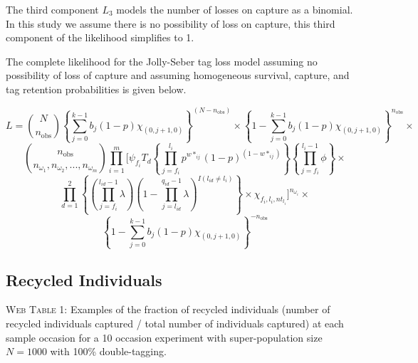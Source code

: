 \documentclass[]{article}
\begin{document}
The third component \(L_3\) models the number of losses on capture as a
binomial. In this study we assume there is no possibility of loss on
capture, this third component of the likelihood simplifies to 1. 


The complete likelihood for the Jolly-Seber tag loss model assuming no
possibility of loss of capture and assuming homogeneous survival,
capture, and tag retention probabilities is given below.

\[
L=\binom{N}{n_\text{obs}} \left\{ \sum_{j=0}^{k-1} b_j(1-p)\chi_{(0,j+1,0)} \right\} ^{(N-n_\text{obs})} \times \left\{ 1- \sum_{j=0}^{k-1} b_j(1-p)\chi_{(0,j+1,0)} \right\} ^{n_\text{obs}} \times
\] \[
\binom{n_\text{obs}}{n_{\omega_1},n_{\omega_2},...,n_{\omega_m}} \prod_{i=1}^{m} \Bigg[ \psi_{f_i} T_d \left\{ \prod_{j=f_i}^{l_i} p^{w*_{ij}} (1-p)^{(1-w*_{ij})} \right\} \left\{ \prod_{j=f_i}^{l_i-1} \phi \right\} \times 
\] \[
\prod_{d=1}^{2} \left\{ \left( \prod_{j=f_i}^{l_{id}-1} \lambda \right) \left(1-\prod_{j=l_{id}}^{q_{id}-1} \lambda \right)^{I(l_{id} \neq l_i)} \right\} \times \chi_{f_i, l_i, nt_{l_i}} \Bigg]^{n_{\omega_i}} \times 
\] \[
\left\{ 1- \sum_{j=0}^{k-1} b_j(1-p)\chi_{(0,j+1,0)} \right\} ^{-n_\text{obs}}
\]

\newpage

\subsection{Recycled Individuals}\label{recycled-individuals}

\textsc{Web Table 1:} Examples of the fraction of recycled individuals
(number of recycled individuals captured / total number of individuals
captured) at each sample occasion for a 10 occasion experiment with
super-population size \(N=1000\) with 100\% double-tagging.
\end{document}
